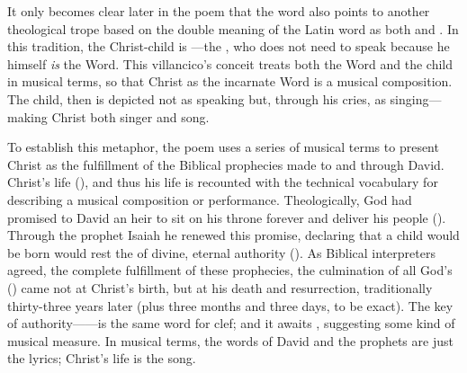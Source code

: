 It only becomes clear later in the poem that the word  also
points to another theological trope based on the double meaning of the Latin
word  as both  and .
In this tradition, the Christ-child is ---the
, who does not need to speak because he himself
\emph{is} the Word.
This villancico's conceit treats both the Word and the child in musical terms,
so that Christ as the incarnate Word is a musical composition.
The child, then is depicted not as speaking but, through his cries, as
singing---making Christ both singer and song.

To establish this metaphor, the poem uses a series of musical terms to present
Christ as the fulfillment of the Biblical prophecies made to and through David.
Christ's life  (), and
thus his life is recounted with the technical vocabulary for describing a
musical composition or performance.
Theologically, God had promised to David an heir to sit on his throne forever
and deliver his people ().
Through the prophet Isaiah he renewed this promise, declaring that a child
would be born  would rest the  of
divine, eternal authority ().
As Biblical interpreters agreed, the complete fulfillment of these prophecies,
the culmination of all God's 
() came not at Christ's birth, but at his death and resurrection,
traditionally thirty-three years later (plus three months and three days, to be
exact).%
    \Autocites
    [17]{Lapide:Gospels19C}
    []{Ricciardo:CommentariaSymbolica}
    []{Bongo:NumerorumMysteria}
    [for an earlier use of same number symbol by Gutiérrez de Padilla, see][]
    {Cashner:Cards}
The key of authority------is the same word for clef; and it awaits
, suggesting some kind of musical measure.
In musical terms, the words of David and the prophets are just the lyrics;
Christ's life is the song.


